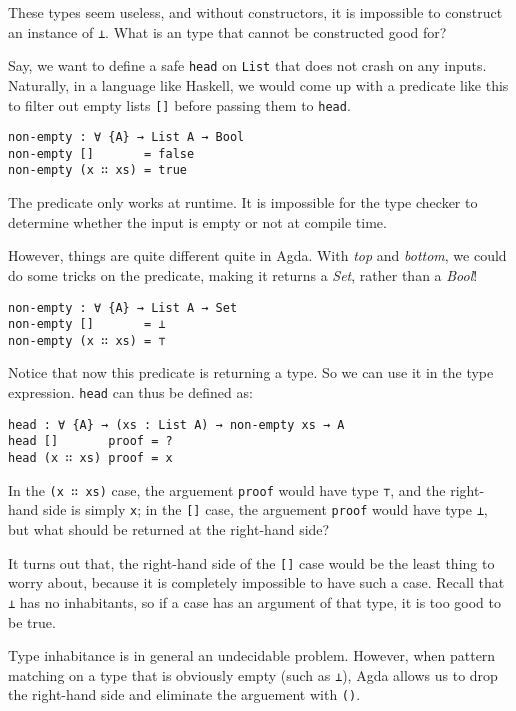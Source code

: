 \documentclass[12pt, a4paper]{article}
\begin{document}
These types seem useless, and without constructors, it is impossible to
construct an instance of {\lstinline|⊥|}. What is an type that cannot be
constructed good for?

Say, we want to define a safe {\lstinline|head|} on {\lstinline|List|} that
does not crash on any inputs. Naturally, in a language like Haskell,
we would come up with a predicate like this to filter out empty lists
{\lstinline|[]|} before passing them to {\lstinline|head|}.

\begin{lstlisting}
non-empty : ∀ {A} → List A → Bool
non-empty []       = false
non-empty (x ∷ xs) = true
\end{lstlisting}

The predicate only works at runtime. It is impossible for the type
checker to determine whether the input is empty or not at compile time.

However, things are quite different quite in Agda. With \textit{top} and \textit{bottom},
we could do some tricks on the predicate, making it returns a \textit{Set}, rather
than a \textit{Bool}!

\begin{lstlisting}
non-empty : ∀ {A} → List A → Set
non-empty []       = ⊥
non-empty (x ∷ xs) = ⊤
\end{lstlisting}

Notice that now this predicate is returning a type. So we can use it in the type
expression. {\lstinline|head|} can thus be defined as:

\begin{lstlisting}
head : ∀ {A} → (xs : List A) → non-empty xs → A
head []       proof = ?
head (x ∷ xs) proof = x
\end{lstlisting}

In the {\lstinline|(x ∷ xs)|} case, the arguement {\lstinline|proof|} would
have type {\lstinline|⊤|}, and the right-hand side is simply {\lstinline|x|};
in the {\lstinline|[]|} case, the arguement {\lstinline|proof|} would
have type {\lstinline|⊥|}, but what should be returned at the right-hand side?

It turns out that, the right-hand side of the {\lstinline|[]|} case would be the
least thing to worry about, because it is completely impossible to have such a case.
Recall that {\lstinline|⊥|} has no inhabitants, so if a case has an argument of
that type, it is too good to be true.

Type inhabitance is in general an undecidable problem.
However, when pattern matching on a type that is obviously empty (such as {\lstinline|⊥|}),
Agda allows us to drop the right-hand side and eliminate the arguement with {\lstinline|()|}.
\end{document}
